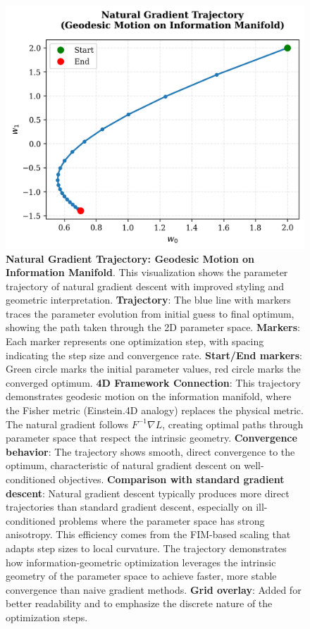 \documentclass[
  10pt,
]{article}
\begin{document}
\begin{figure}
\centering
\includegraphics{../output/figures/natural_gradient_path.png}
\caption{\textbf{Natural Gradient Trajectory: Geodesic Motion on
Information Manifold}. This visualization shows the parameter trajectory
of natural gradient descent with improved styling and geometric
interpretation. \textbf{Trajectory}: The blue line with markers traces
the parameter evolution from initial guess to final optimum, showing the
path taken through the 2D parameter space. \textbf{Markers}: Each marker
represents one optimization step, with spacing indicating the step size
and convergence rate. \textbf{Start/End markers}: Green circle marks the
initial parameter values, red circle marks the converged optimum.
\textbf{4D Framework Connection}: This trajectory demonstrates geodesic
motion on the information manifold, where the Fisher metric (Einstein.4D
analogy) replaces the physical metric. The natural gradient follows
\(F^{-1}\nabla L\), creating optimal paths through parameter space that
respect the intrinsic geometry. \textbf{Convergence behavior}: The
trajectory shows smooth, direct convergence to the optimum,
characteristic of natural gradient descent on well-conditioned
objectives. \textbf{Comparison with standard gradient descent}: Natural
gradient descent typically produces more direct trajectories than
standard gradient descent, especially on ill-conditioned problems where
the parameter space has strong anisotropy. This efficiency comes from
the FIM-based scaling that adapts step sizes to local curvature. The
trajectory demonstrates how information-geometric optimization leverages
the intrinsic geometry of the parameter space to achieve faster, more
stable convergence than naive gradient methods. \textbf{Grid overlay}:
Added for better readability and to emphasize the discrete nature of the
optimization steps.}
\end{figure}
\end{document}
